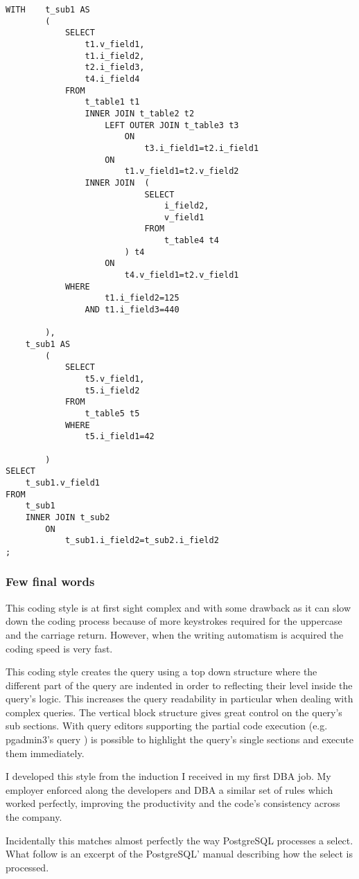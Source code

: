 \begin{lstlisting}[style=pgsql]
WITH	t_sub1 AS
		(
			SELECT 
				t1.v_field1,
				t1.i_field2,
				t2.i_field3,
				t4.i_field4
			FROM 
				t_table1 t1 
				INNER JOIN t_table2 t2
					LEFT OUTER JOIN t_table3 t3
						ON
							t3.i_field1=t2.i_field1
					ON
						t1.v_field1=t2.v_field2
				INNER JOIN 	(
							SELECT 
								i_field2,
								v_field1
							FROM
								t_table4 t4
						) t4
					ON
						t4.v_field1=t2.v_field1
			WHERE 
					t1.i_field2=125
				AND	t1.i_field3=440
		
		),
	t_sub1 AS
		(
			SELECT
				t5.v_field1,
				t5.i_field2
			FROM
				t_table5 t5
			WHERE 
				t5.i_field1=42
		
		)
SELECT 
	t_sub1.v_field1
FROM
	t_sub1
	INNER JOIN t_sub2
		ON
			t_sub1.i_field2=t_sub2.i_field2
;
\end{lstlisting}



\subsubsection{Few final words}

This coding style is at first sight complex and with some drawback as it can slow down the coding process because 
of more keystrokes required for the uppercase and the carriage return. However, when the writing automatism is acquired 
the coding speed is very fast.\newline

This coding style creates the query using a top down structure where the different part of the query are 
indented in order to reflecting their level inside the query's logic. This increases the query readability in 
particular when dealing with complex queries. The vertical block structure gives great control on the query's sub 
sections. With query editors supporting the partial code execution  (e.g. pgadmin3's query ) is possible to highlight 
the query's single sections and execute them immediately. 

I developed this style from the induction I received in my first DBA job. My employer enforced along the developers and 
DBA a similar set of rules which worked perfectly, improving the productivity and the code's consistency across the 
company.\newline

Incidentally this matches almost perfectly the way PostgreSQL processes a select. What follow is an excerpt of the 
PostgreSQL' manual describing how the select is processed.

